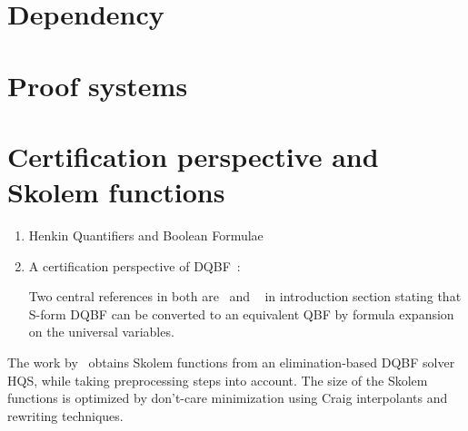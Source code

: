 \documentclass{article}
\begin{document}
\section{Dependency}

\section{Proof systems}

\section{Certification perspective and Skolem functions}

\begin{enumerate}
	\item Henkin Quantifiers and Boolean Formulae~\cite{balabanov2012henkin}
	
	\item A certification perspective of DQBF~\cite{balabanov2014henkin}:
	
	Two central references in both are~\cite{bubeck2006dependency} and ~\cite{bubeck2010model} in introduction section stating that S-form DQBF can be converted to an equivalent QBF by formula expansion on the universal variables.
	
\end{enumerate}

The work by~\cite{wimmer2016skolem} obtains Skolem functions from an elimination-based DQBF solver HQS, while taking preprocessing steps into account.
%
The size of the Skolem functions is optimized by don’t-care minimization using Craig interpolants and rewriting techniques.

%


\end{document}
